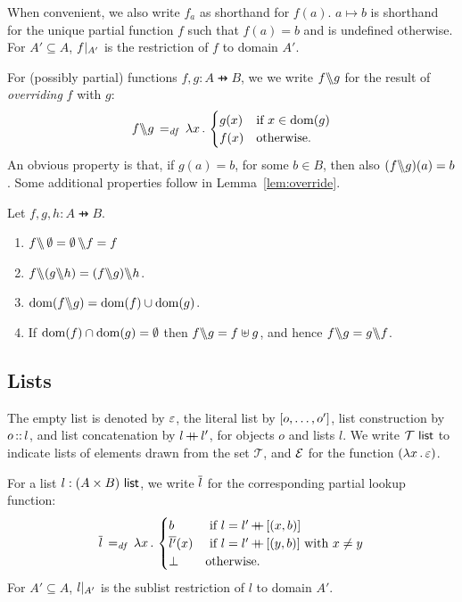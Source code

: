 \documentclass[11pt]{report}
\begin{document}
 When convenient, we also write $f_a$ as shorthand for $f(a)$. $a \mapsto b$ is shorthand for the unique partial function $f$ such that $f(a) = b$ and is undefined otherwise. For $A' \subseteq A$, $f |_{A'}$ is the restriction of $f$ to domain $A'$. 

For (possibly partial) functions $f,g : A \pfun B$, we we write $f \backslash\!\!\backslash g$ for the result of \emph{overriding} $f$ with $g$: \[ f \backslash\!\!\backslash g \operatorname{\;=_{\mathit{df}}\;} \lambda x\,.\, \begin{cases}
  g(x) & \text{if $x \in \operatorname{\mathrm{dom}}(g)$} \\
  f(x) & \text{otherwise.}
\end{cases} \] An obvious property is that, if $g(a) = b$, for some $b \in B$, then also $(f \backslash\!\!\backslash g)(a) = b$. Some additional properties follow in Lemma~\ref{lem:override}. 

\begin{lemma}
    \label{lem:override}
    Let $f,g,h : A \pfun B$. 
    \begin{enumerate}
        \item $f \backslash\!\!\backslash \operatorname{\emptyset} = \operatorname{\emptyset} \backslash\!\!\backslash f = f$
        \item $f \override (g \override h) = (f \override g) \override h$. 
        \item $\operatorname{\mathrm{dom}}(f \backslash\!\!\backslash g) = \operatorname{\mathrm{dom}}(f) \cup \operatorname{\mathrm{dom}}(g)$. 
        \item If $\operatorname{\mathrm{dom}}(f) \cap \operatorname{\mathrm{dom}}(g) = \operatorname{\emptyset}$ then $f \backslash\!\!\backslash g = f \uplus g$, and hence $f \backslash\!\!\backslash g = g \backslash\!\!\backslash f$. 
    \end{enumerate}
\end{lemma}

\subsection{Lists}
\label{sec:lists}

The empty list is denoted by $\varepsilon$, the literal list by $\left[o,\ldots, o'\right]$, list construction by $o \operatorname{:\!:} l$, and list concatenation by $l \operatorname{+\!\!\!+} l'$, for objects $o$ and lists $l$. We write $\mathcal{T}~\mathsf{list}$ to indicate lists of elements drawn from the set $\mathcal{T}$, and $\mathcal{E}$ for the function $(\lambda x\,.\, \varepsilon)$. 

For a list $l : (A \times B)~\mathsf{list}$, we write $\overline{l}$ for the corresponding partial lookup function: \[ \overline{l} \operatorname{\;=_{\mathit{df}}\;} \lambda x\,.\, \begin{cases}
  b &\text{ if $l = l' \operatorname{+\!\!\!+} \left[(x,b)\right]$}\\
  \overline{l'}(x) &\text{ if $l = l' \operatorname{+\!\!\!+} \left[(y,b)\right]$ with $x \neq y$}\\
  \bot & \text{otherwise.}
\end{cases}\] For $A' \subseteq A$, $l |_{A'}$ is the sublist restriction of $l$ to domain $A'$.
\end{document}
